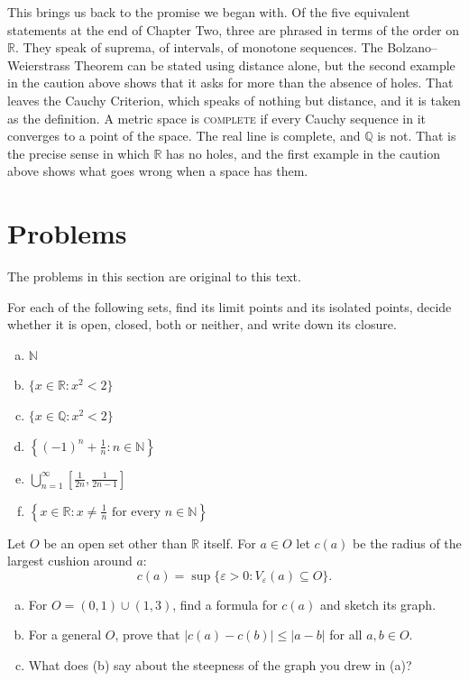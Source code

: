 This brings us back to the promise we began with.  Of the five equivalent statements at the end of Chapter Two, three are phrased in terms of the order on $\mathbb{R}$.  They speak of suprema, of intervals, of monotone sequences.  The Bolzano--Weierstrass Theorem can be stated using distance alone, but the second example in the caution above shows that it asks for more than the absence of holes.  That leaves the Cauchy Criterion, which speaks of nothing but distance, and it is taken as the definition.  A metric space is \textsc{complete} if every Cauchy sequence in it converges to a point of the space.  The real line is complete, and $\mathbb{Q}$ is not.  That is the precise sense in which $\mathbb{R}$ has no holes, and the first example in the caution above shows what goes wrong when a space has them.

\section{Problems}

\noindent The problems in this section are original to this text.

\begin{problem}
For each of the following sets, find its limit points and its isolated points, decide whether it is open, closed, both or neither, and write down its closure.
\begin{enumerate}[(a)]
	\item $\mathbb{N}$
	\item $\{x \in \mathbb{R} : x^2 < 2\}$
	\item $\{x \in \mathbb{Q} : x^2 < 2\}$
	\item $\left\{(-1)^n + \frac1n : n \in \mathbb{N}\right\}$
	\item $\displaystyle\bigcup_{n=1}^{\infty} \left[\frac{1}{2n}, \frac{1}{2n-1}\right]$
	\item $\left\{x \in \mathbb{R} : x \neq \frac1n \text{ for every } n \in \mathbb{N}\right\}$
\end{enumerate}
\end{problem}

\begin{problem}
Let $O$ be an open set other than $\mathbb{R}$ itself.  For $a \in O$ let $c(a)$ be the radius of the largest cushion around $a$:
\[ c(a) = \sup\{\varepsilon > 0 : V_{\varepsilon}(a) \subseteq O\}. \]
\begin{enumerate}[(a)]
	\item For $O = (0,1) \cup (1,3)$, find a formula for $c(a)$ and sketch its graph.
	\item For a general $O$, prove that $|c(a) - c(b)| \leq |a - b|$ for all $a, b \in O$.
	\item What does (b) say about the steepness of the graph you drew in (a)?
\end{enumerate}
\end{problem}

